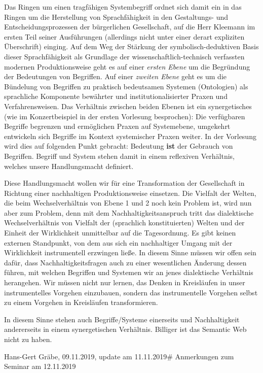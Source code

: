 \documentclass[11pt,a4paper]{article}
\begin{document}
Das Ringen um einen tragfähigen Systembegriff ordnet sich damit ein in
das Ringen um die Herstellung von Sprachfähigkeit in den Gestaltungs-
und Entscheidungsprozessen der bürgerlichen Gesellschaft, auf die Herr
Kleemann im ersten Teil seiner Ausführungen (allerdings nicht unter
einer derart expliziten Überschrift) einging. Auf dem Weg der Stärkung
der symbolisch-deduktiven Basis dieser Sprachfähigkeit als Grundlage der
wissenschaftlich-technisch verfassten modernen Produktionsweise geht es
auf einer \emph{ersten Ebene} um die Begründung der Bedeutungen von
Begriffen. Auf einer \emph{zweiten Ebene} geht es um die Bündelung von
Begriffen zu praktisch bedeutsamen Systemen (Ontologien) als sprachliche
Komponente bewährter und institutionalisierter Praxen und
Verfahrensweisen. Das Verhältnis zwischen beiden Ebenen ist ein
synergetisches (wie im Konzertbeispiel in der ersten Vorlesung
besprochen): Die verfügbaren Begriffe begrenzen und ermöglichen Praxen
auf Systemebene, umgekehrt entwickeln sich Begriffe im Kontext
systemischer Praxen weiter. In der Vorlesung wird dies auf folgenden
Punkt gebracht: Bedeutung \textbf{ist} der Gebrauch von Begriffen.
Begriff und System stehen damit in einem reflexiven Verhältnis, welches
unsere Handlungsmacht definiert.

Diese Handlungsmacht wollen wir für eine Transformation der Gesellschaft
in Richtung einer nachhaltigen Produktionsweise einsetzen. Die Vielfalt
der Welten, die beim Wechselverhältnis von Ebene 1 und 2 noch kein
Problem ist, wird nun aber zum Problem, denn mit dem
Nachhaltigkeitsanspruch tritt das dialektische Wechselverhältnis von
Vielfalt der (sprachlich konstituierten) Welten und der Einheit der
Wirklichkeit unmittelbar auf die Tagesordnung. Es gibt keinen externen
Standpunkt, von dem aus sich ein nachhaltiger Umgang mit der
Wirklichkeit instrumentell erzwingen ließe. In diesem Sinne müssen wir
offen sein dafür, dass Nachhaltigkeitsfragen auch zu einer wesentlichen
Änderung dessen führen, mit welchen Begriffen und Systemen wir an jenes
dialektische Verhältnis herangehen. Wir müssen nicht nur lernen, das
Denken in Kreisläufen in unser instrumentelles Vorgehen einzubauen,
sondern das instrumentelle Vorgehen selbst zu einem Vorgehen in
Kreisläufen transformieren.

In diesem Sinne stehen auch Begriffe/Systeme einerseits und
Nachhaltigkeit andererseits in einem synergetischen Verhältnis. Billiger
ist das Semantic Web nicht zu haben.

Hans-Gert Gräbe, 09.11.2019, update am 11.11.2019\# Anmerkungen zum
Seminar am 12.11.2019
\end{document}
